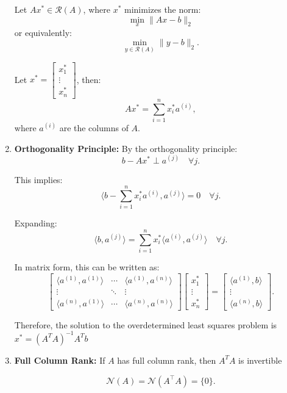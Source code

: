 \begin{derivation}
\begin{enumerate}
    Let $A x^* \in \mathcal{R}(A)$, where $x^*$ minimizes the norm:
    \[
    \min_x \|A x - b\|_2
    \]
    or equivalently:
    \[
    \min_{y \in \mathcal{R}(A)} \|y - b\|_2.
    \]

    Let $x^* = \begin{bmatrix} x_1^* \\ \vdots \\ x_n^* \end{bmatrix}$, then:
    \[
    A x^* = \sum_{i=1}^n x_i^* a^{(i)},
    \]
    where $a^{(i)}$ are the columns of $A$. \\

    \item \textbf{Orthogonality Principle:} By the orthogonality principle:
    \[
    b - A x^* \perp a^{(j)} \quad \forall j.
    \]

    This implies:
    \[
    \langle b - \sum_{i=1}^n x_i^* a^{(i)}, a^{(j)} \rangle = 0 \quad \forall j.
    \]

    Expanding:
    \[
    \langle b, a^{(j)} \rangle = \sum_{i=1}^n x_i^* \langle a^{(i)}, a^{(j)} \rangle \quad \forall j.
    \]

    In matrix form, this can be written as:
    \[
    \begin{bmatrix}
    \langle a^{(1)}, a^{(1)} \rangle & \cdots & \langle a^{(1)}, a^{(n)} \rangle \\
    \vdots & \ddots & \vdots \\
    \langle a^{(n)}, a^{(1)} \rangle & \cdots & \langle a^{(n)}, a^{(n)} \rangle
    \end{bmatrix}
    \begin{bmatrix}
    x_1^* \\
    \vdots \\
    x_n^*
    \end{bmatrix}
    =
    \begin{bmatrix}
    \langle a^{(1)}, b \rangle \\
    \vdots \\
    \langle a^{(n)}, b \rangle
    \end{bmatrix}.
    \]

    Therefore, the solution to the overdetermined least squares problem is $x^* = (A^T A)^{-1} A^T b$

    \item \textbf{Full Column Rank:} If $A$ has full column rank, then $A^T A$ is invertible

    \[
    \mathcal{N}(A) = \mathcal{N}(A^\top A) = \{0\}.
    \]


\end{enumerate}
\end{derivation}
